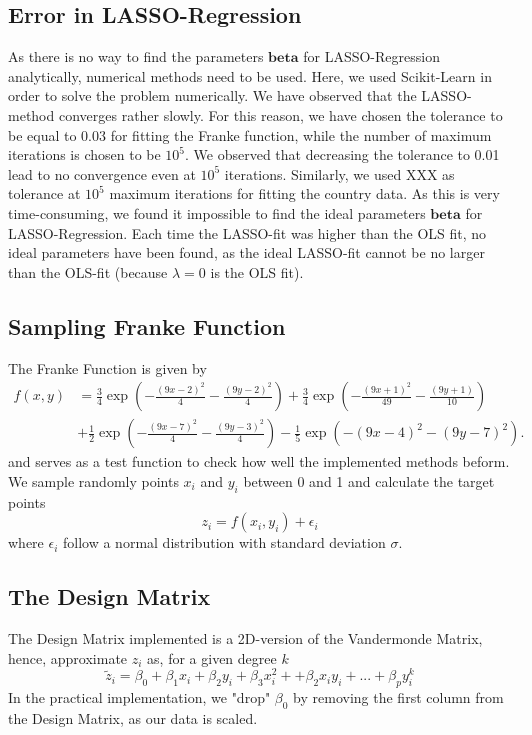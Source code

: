 \documentclass[11pt,a4paper,titlepage]{article}
\begin{document}
\subsection{Error in LASSO-Regression}
As there is no way to find the parameters $\bm{beta}$ for LASSO-Regression analytically, numerical methods need to be used. Here, we used Scikit-Learn in order to solve the problem numerically. We have observed that the LASSO-method converges rather slowly. For this reason, we have chosen the tolerance to be equal to 0.03 for fitting the Franke function, while the number of maximum iterations is chosen to be $10^5$. We observed that decreasing the tolerance to 0.01 lead to no convergence even at $10^5$ iterations. Similarly, we used XXX as tolerance at $10^5$ maximum iterations for fitting the country data. As this is very time-consuming, we found it impossible to find the ideal parameters $\bm{beta}$ for LASSO-Regression. Each time the LASSO-fit was higher than the OLS fit, no ideal parameters have been found, as the ideal LASSO-fit cannot be no larger than the OLS-fit (because $\lambda=0$ is the OLS fit).
\subsection{Sampling Franke Function}
The Franke Function is given by
\begin{align}\label{FrankeFunction}
f(x,y) &= \frac{3}{4}\exp{\left(-\frac{(9x-2)^2}{4} - \frac{(9y-2)^2}{4}\right)}+\frac{3}{4}\exp{\left(-\frac{(9x+1)^2}{49}- \frac{(9y+1)}{10}\right)}\nonumber \\
&+\frac{1}{2}\exp{\left(-\frac{(9x-7)^2}{4} - \frac{(9y-3)^2}{4}\right)} -\frac{1}{5}\exp{\left(-(9x-4)^2 - (9y-7)^2\right) }.
\end{align}
and serves as a test function to check how well the implemented methods beform.
We sample randomly points $x_i$ and $y_i$ between 0 and 1 and calculate the target points
\begin{equation*}
z_i=f(x_i,y_i)+\epsilon_i
\end{equation*}
where $\epsilon_i$ follow a normal distribution with standard deviation $\sigma$.
\subsection{The Design Matrix}
The Design Matrix implemented is a 2D-version of the Vandermonde Matrix, hence, approximate $z_i$ as, for a given degree $k$
\begin{equation*}
\tilde z_i=\beta_0+\beta_1x_i+\beta_2y_i+\beta_3x_i^2++\beta_2x_iy_i+...+\beta_py_i^k
\end{equation*}
In the practical implementation, we "drop" $\beta_0$ by removing the first column from the Design Matrix, as our data is scaled.
\end{document}
